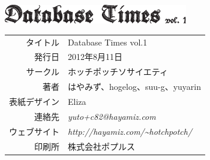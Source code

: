 \documentclass[b5paper,papersize,tombow,12pt]{jsbook}
\begin{document}
\newpage

\vspace*{50mm}

\begin{center}
 \includegraphics[width=8cm]{hayamiz/images/colophon.eps}
 \par\vspace*{1mm}
 \begin{tabular}{rl}
  \hline
  タイトル & Database Times vol.1 \\
  発行日 & 2012年8月11日 \\
  サークル & ホッチポッチソサイエティ \\
  著者 & はやみず、hogelog、suu-g、yuyarin \\
  表紙デザイン & Eliza \\
  連絡先 & {\it yuto+c82@hayamiz.com} \\
  ウェブサイト & {\it http://hayamiz.com/\~{}hotchpotch/} \\
  印刷所 & 株式会社ポプルス \\
  \hline
 \end{tabular}
\end{center}
\end{document}
